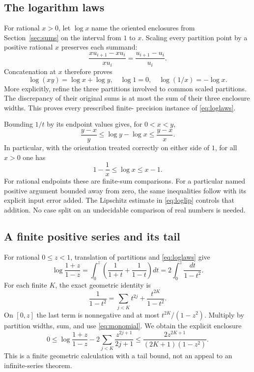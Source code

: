 \documentclass[11pt]{article}
\theoremstyle{definition}
\begin{document}
\subsection{The logarithm laws}

For rational $x>0$, let $\log x$ name the oriented enclosures from
Section~\ref{sec:sums} on the interval from $1$ to $x$. Scaling every
partition point by a positive rational $x$ preserves each summand:
\[
 \frac{xu_{i+1}-xu_i}{xu_i}
 =\frac{u_{i+1}-u_i}{u_i}.
\]
Concatenation at $x$ therefore proves
\begin{equation}\label{eq:loglaws}
 \log(xy)=\log x+\log y,\quad \log1=0,\quad
 \log(1/x)=-\log x.
\end{equation}
More explicitly, refine the three partitions involved to common scaled
partitions. The discrepancy of their original sums is at most the sum of
their three enclosure widths. This proves every prescribed finite-
precision instance of \eqref{eq:loglaws}.

Bounding $1/t$ by its endpoint values gives, for $0<x<y$,
\begin{equation}\label{eq:loglip}
 \frac{y-x}{y}\le\log y-\log x\le\frac{y-x}{x}.
\end{equation}
In particular, with the orientation treated correctly on either side of
$1$, for all $x>0$ one has
\begin{equation}\label{eq:logglobal}
 1-\frac1x\le\log x\le x-1.
\end{equation}
For rational endpoints these are finite-sum comparisons. For a particular
named positive argument bounded away from zero, the same inequalities
follow with its explicit input error added. The Lipschitz estimate in
\eqref{eq:loglip} controls that addition. No case split on an undecidable
comparison of real numbers is needed.

\subsection{A finite positive series and its tail}

For rational $0\le z<1$, translation of partitions and
\eqref{eq:loglaws} give
\[
 \log\frac{1+z}{1-z}
 =\int_0^z\left(\frac1{1+t}+\frac1{1-t}\right)dt
 =2\int_0^z\frac{dt}{1-t^2}.
\]
For each finite $K$, the exact geometric identity is
\[
 \frac1{1-t^2}=\sum_{j<K}t^{2j}+\frac{t^{2K}}{1-t^2}.
\]
On $[0,z]$ the last term is nonnegative and at most
$t^{2K}/(1-z^2)$. Multiply by partition widths, sum, and use
\eqref{eq:monomial}. We obtain the explicit enclosure
\begin{equation}\label{eq:atanh}
 0\le\log\frac{1+z}{1-z}-2\sum_{j<K}\frac{z^{2j+1}}{2j+1}
 \le\frac{2z^{2K+1}}{(2K+1)(1-z^2)}.
\end{equation}
This is a finite geometric calculation with a tail bound, not an appeal
to an infinite-series theorem.
\end{document}
